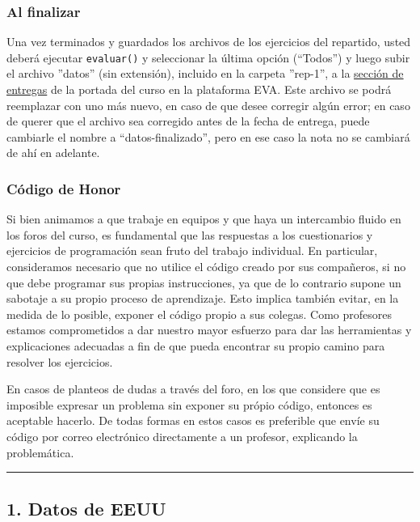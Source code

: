 \documentclass[]{article}
\begin{document}
\subsubsection{Al finalizar}

Una vez terminados y guardados los archivos de los ejercicios del
repartido, usted deberá ejecutar \texttt{evaluar()} y seleccionar la
última opción (``Todos'') y luego subir el archivo ''datos'' (sin
extensión), incluido en la carpeta ''rep-1'', a la
\href{http://eva.universidad.edu.uy/mod/assign/view.php?id=122712}{sección
de entregas} de la portada del curso en la plataforma EVA. Este archivo
se podrá reemplazar con uno más nuevo, en caso de que desee corregir
algún error; en caso de querer que el archivo sea corregido antes de la
fecha de entrega, puede cambiarle el nombre a ``datos-finalizado'', pero
en ese caso la nota no se cambiará de ahí en adelante.

\subsubsection{Código de Honor}

Si bien animamos a que trabaje en equipos y que haya un intercambio
fluido en los foros del curso, es fundamental que las respuestas a los
cuestionarios y ejercicios de programación sean fruto del trabajo
individual. En particular, consideramos necesario que no utilice el
código creado por sus compañeros, si no que debe programar sus propias
instrucciones, ya que de lo contrario supone un sabotaje a su propio
proceso de aprendizaje. Esto implica también evitar, en la medida de lo
posible, exponer el código propio a sus colegas. Como profesores estamos
comprometidos a dar nuestro mayor esfuerzo para dar las herramientas y
explicaciones adecuadas a fin de que pueda encontrar su propio camino
para resolver los ejercicios.

En casos de planteos de dudas a través del foro, en los que considere
que es imposible expresar un problema sin exponer su própio código,
entonces es aceptable hacerlo. De todas formas en estos casos es
preferible que envíe su código por correo electrónico directamente a un
profesor, explicando la problemática.

\begin{center}\rule{3in}{0.4pt}\end{center}

\subsection{1. Datos de EEUU}
\end{document}
